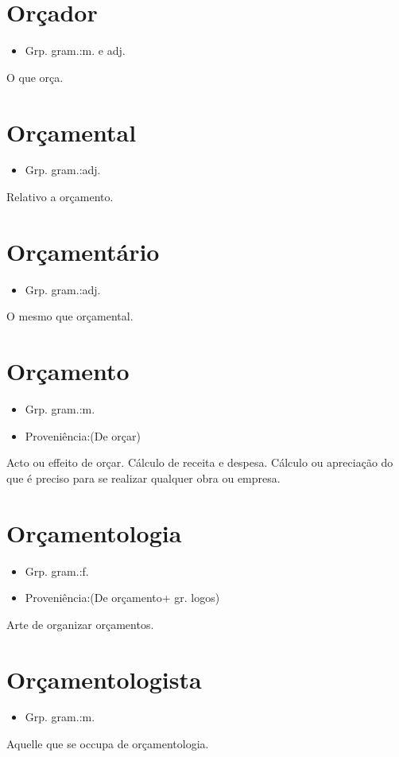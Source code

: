 \section{Orçador}
\begin{itemize}
\item {Grp. gram.:m.  e  adj.}
\end{itemize}
O que orça.
\section{Orçamental}
\begin{itemize}
\item {Grp. gram.:adj.}
\end{itemize}
Relativo a orçamento.
\section{Orçamentário}
\begin{itemize}
\item {Grp. gram.:adj.}
\end{itemize}
O mesmo que \textunderscore orçamental\textunderscore .
\section{Orçamento}
\begin{itemize}
\item {Grp. gram.:m.}
\end{itemize}
\begin{itemize}
\item {Proveniência:(De \textunderscore orçar\textunderscore )}
\end{itemize}
Acto ou effeito de orçar.
Cálculo de receita e despesa.
Cálculo ou apreciação do que é preciso para se realizar qualquer obra ou empresa.
\section{Orçamentologia}
\begin{itemize}
\item {Grp. gram.:f.}
\end{itemize}
\begin{itemize}
\item {Proveniência:(De \textunderscore orçamento\textunderscore  + gr. \textunderscore logos\textunderscore )}
\end{itemize}
Arte de organizar orçamentos.
\section{Orçamentologista}
\begin{itemize}
\item {Grp. gram.:m.}
\end{itemize}
Aquelle que se occupa de orçamentologia.
